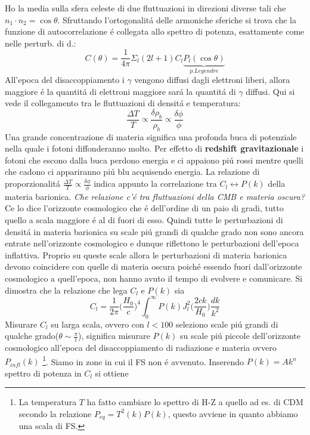 \documentclass[12pt, a4paper]{article}
\begin{document}
Ho la media sulla sfera celeste di due fluttuazioni in direzioni diverse tali che $n_1\cdot n_2=\cos{\theta}$. Sfruttando l'ortogonalit\'{a} delle armoniche sferiche si trova che la funzione di autocorrelazione \'{e} collegata allo spettro di potenza, esattamente come nelle perturb. di d.:
\begin{equation}
C(\theta)=\frac{1}{4\pi} \Sigma_l(2l+1)C_l\underbrace{ P_l(\cos{\theta})}_{p. Legendre}
\end{equation}
All'epoca del disaccoppiamento i $\gamma$ vengono diffusi dagli elettroni liberi, allora maggiore \'{e} la quantit\'{a} di elettroni maggiore sar\'{a} la quantit\'{a} di $\gamma$ diffusi. Qui si vede il collegamento tra le fluttuazioni di densit\'{a} e temperatura:
\begin{equation}
\frac{\Delta T}{T} \propto \frac{\delta\rho_b}{\rho_b} \propto \frac{\delta \phi}{\phi}
\end{equation}
Una grande concentrazione di materia significa una profonda buca di potenziale nella quale i fotoni diffonderanno molto. Per effetto di \textbf{redshift gravitazionale} i fotoni che escono dalla buca perdono energia e ci appaiono pi\'{u} rossi mentre quelli che cadono ci appariranno pi\'{u} blu acquisendo energia. La relazione di proporzionalit\'{a} $\frac{\Delta T}{T} \propto \frac{\delta\phi}{\phi}$ indica appunto la correlazione tra $C_l \leftrightarrow P(k)$ della materia barionica. \textit{Che relazione c'\'{e} tra fluttuazioni della CMB e materia oscura?} Ce lo dice l'orizzonte cosmologico che \'{e} dell'ordine di un paio di gradi, tutto quello a scala maggiore \'{e} al di fuori di esso. Quindi tutte le perturbazioni di densit\'{a} in materia barionica su scale pi\'{u} grandi di qualche grado non sono ancora entrate nell'orizzonte cosmologico e dunque riflettono le perturbazioni dell'epoca inflattiva. Proprio su queste scale allora le perturbazioni di materia barionica devono coincidere con quelle di materia oscura poich\'{e} essendo fuori dall'orizzonte cosmologico a quell'epoca, non hanno avuto il tempo di evolvere e comunicare. Si dimostra che la relazione che lega $C_l$ e $P(k)$ sia
\begin{equation}
C_l=\frac{1}{2\pi} \biggl( \frac{H_0}{c}\biggr)^4 \int_0^{\infty }P(k) J_l^2\biggl( \frac{2ck}{H_0}\biggl)\frac{dk}{k^2}
\end{equation}
Misurare $C_l$ su larga scala, ovvero con $l<100$ seleziono scale pi\'{u} grandi di qualche grado($\theta\sim \frac{\pi}{l}$), significa misurare $P(k)$ su scale pi\'{u} piccole dell'orizzonte cosmologico all'epoca del disaccoppiamento di radiazione e materia ovvero $P_{infl}(k)$ \footnote{La temperatura $T$ ha fatto cambiare lo spettro di H-Z a quello ad es. di CDM secondo la relazione $P_{eq}=T^2(k)P(k)$, questo avviene in quanto abbiamo una scala di FS.}. Siamo in zone in cui il FS non \'{e} avvenuto. Inserendo $P(k)=Ak^n$ spettro di potenza in $C_l$ si ottiene
\end{document}
